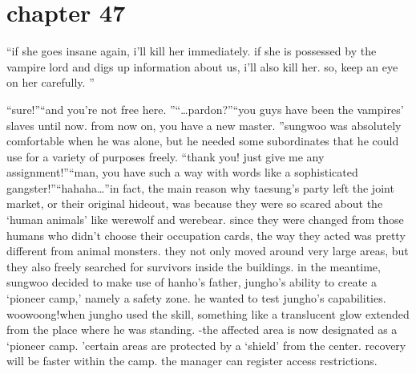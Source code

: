 \section{chapter 47}

                            “if she goes insane again, i’ll kill her immediately.
 if she is possessed by the vampire lord and digs up information about us, i’ll also kill her.
 so, keep an eye on her carefully.
”




“sure!”“and you’re not free here.
”“…pardon?”“you guys have been the vampires’ slaves until now.
 from now on, you have a new master.
”sungwoo was absolutely comfortable when he was alone, but he needed some subordinates that he could use for a variety of purposes freely.
“thank you! just give me any assignment!”“man, you have such a way with words like a sophisticated gangster!”“hahaha…”in fact, the main reason why taesung’s party left the joint market, or their original hideout, was because they were so scared about the ‘human animals’ like werewolf and werebear.
since they were changed from those humans who didn’t choose their occupation cards, the way they acted was pretty different from animal monsters.
 they not only moved around very large areas, but they also freely searched for survivors inside the buildings.
in the meantime, sungwoo decided to make use of hanho’s father, jungho’s ability to create a ‘pioneer camp,’ namely a safety zone.
 he wanted to test jungho’s capabilities.
woowoong!when jungho used the skill, something like a translucent glow extended from the place where he was standing.
-the affected area is now designated as a ‘pioneer camp.
’certain areas are protected by a ‘shield’ from the center.
recovery will be faster within the camp.
the manager can register access restrictions.

